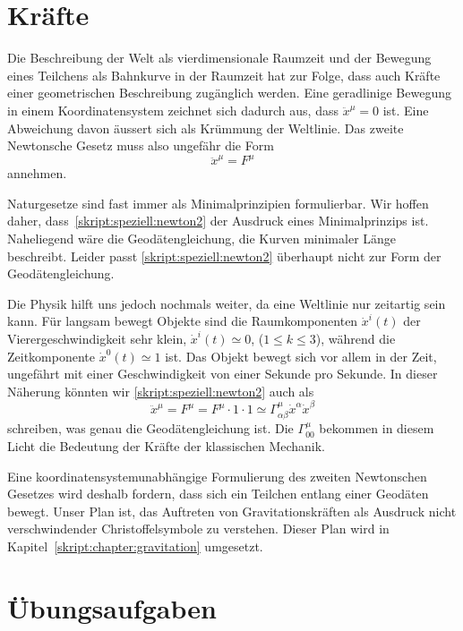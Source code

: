 \section{Kräfte}
Die Beschreibung der Welt als vierdimensionale Raumzeit und der Bewegung
eines Teilchens als Bahnkurve in der Raumzeit hat zur Folge, dass auch
Kräfte einer geometrischen Beschreibung zugänglich werden.
Eine geradlinige Bewegung in einem Koordinatensystem zeichnet sich
dadurch aus, dass $\ddot x^\mu=0$ ist.
Eine Abweichung davon äussert sich als Krümmung der Weltlinie.
Das zweite Newtonsche Gesetz muss also ungefähr die Form
\begin{equation}
\ddot x^\mu = F^\mu
\label{skript:speziell:newton2}
\end{equation}
annehmen.

Naturgesetze sind fast immer als Minimalprinzipien formulierbar.
Wir hoffen daher, dass~\eqref{skript:speziell:newton2} der Ausdruck
eines Minimalprinzips ist.
Naheliegend wäre die Geodätengleichung, die Kurven minimaler Länge 
beschreibt.
Leider passt \eqref{skript:speziell:newton2}
überhaupt nicht zur Form der Geodätengleichung.

Die Physik hilft uns jedoch nochmals weiter, da
eine Weltlinie nur zeitartig sein kann.
Für langsam bewegt Objekte sind die Raumkomponenten $\dot x^i(t)$
der Vierergeschwindigkeit sehr klein, $\dot x^i(t)\simeq 0$,
($1\le k\le 3$), während
die Zeitkomponente $\dot x^0(t)\simeq 1$ ist.
Das Objekt bewegt sich vor allem in der Zeit, ungefährt mit einer
Geschwindigkeit von einer Sekunde pro Sekunde.
In dieser Näherung könnten wir \eqref{skript:speziell:newton2}
auch als
\begin{equation}
\ddot x^\mu
=
F^\mu
=
F^\mu\cdot 1 \cdot 1
\simeq
\Gamma^\mu_{\alpha\beta}\dot x^\alpha\dot x^\beta
\end{equation}
schreiben, was genau die Geodätengleichung ist.
Die $\Gamma^\mu_{00}$ bekommen in diesem Licht die Bedeutung der 
Kräfte der klassischen Mechanik.

Eine koordinatensystemunabhängige Formulierung des zweiten Newtonschen
Gesetzes wird deshalb fordern, dass sich ein Teilchen entlang einer
Geodäten bewegt.
Unser Plan ist, das Auftreten von Gravitationskräften als
Ausdruck nicht verschwindender Christoffelsymbole zu verstehen.
Dieser Plan wird in Kapitel~\ref{skript:chapter:gravitation}
umgesetzt.


\section*{Übungsaufgaben}

